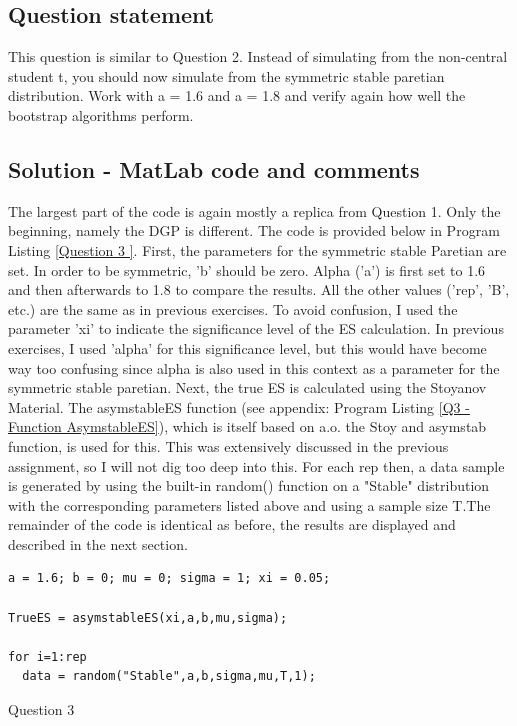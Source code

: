 \documentclass[12pt]{article}
\begin{document}
\subsection*{Question statement}
This question is similar to Question 2. Instead of simulating from the non-central student t, you should now simulate from the symmetric stable paretian distribution. Work with a = 1.6 and a = 1.8 and verify again how well the bootstrap algorithms perform.


\subsection*{Solution - MatLab code and comments}

The largest part of the code is again mostly a replica from Question 1. Only the beginning, namely the DGP is different. The code is provided  below in Program Listing \ref{Question 3 }.\newline
First, the parameters for the symmetric stable Paretian are set. In order to be symmetric, 'b' should be zero. Alpha ('a') is first set to 1.6 and then afterwards to 1.8 to compare the results. All the other values ('rep', 'B', etc.) are the same as in previous exercises. To avoid confusion, I used the parameter 'xi' to indicate the significance level of the ES calculation. In previous exercises, I used 'alpha' for this significance level, but this would have become way too confusing since alpha is also used in this context as a parameter for the symmetric stable paretian.\newline\newline
Next, the true ES is calculated using the Stoyanov Material. The asymstableES function (see appendix: Program Listing \ref{Q3 - Function AsymstableES}), which is itself based on a.o. the Stoy and asymstab function, is used for this. This was extensively discussed in the previous assignment, so I will not dig too deep into this. For each rep then, a data sample is generated by using the built-in random() function on a "Stable" distribution with the corresponding parameters listed above and using a sample size T.The remainder of the code is identical as before, the results are displayed and described in the next section. 

\begin{Program}[!htb]
\begin{lstlisting}[style=Matlab-editor,basicstyle=\mlttfamily\footnotesize]
%% Question 3 -------------------------------------------------- 
a = 1.6; b = 0; mu = 0; sigma = 1; xi = 0.05;

TrueES = asymstableES(xi,a,b,mu,sigma);

for i=1:rep
  data = random("Stable",a,b,sigma,mu,T,1);
\end{lstlisting}
\caption{Question 3 }
\label{Question 3 }
\end{Program}
\end{document}
